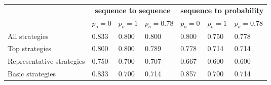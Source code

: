 \begin{tabular}{lllllll}
\toprule
{} & \multicolumn{3}{c}{\textbf{sequence to sequence}} & \multicolumn{3}{c}{\textbf{sequence to probability}} \\
{} &                       $p_o=0$ &                     $p_o=1$ &                    $p_o=0.78$ &                       $p_o=0$ &                       $p_o=1$ &                    $p_o=0.78$ \\
\midrule
All strategies          &  \cellcolor{orange!83.0}0.833   &  \cellcolor{orange!80.0}0.800 &    \cellcolor{orange!80.0}0.800 &    \cellcolor{orange!80.0}0.800 &   \cellcolor{orange!75.0}0.750 &  \cellcolor{orange!78.0}0.778 \\
Top strategies          &    \cellcolor{orange!80.0}0.800 &  \cellcolor{orange!80.0}0.800 &  \cellcolor{orange!79.0}0.789 &  \cellcolor{orange!78.0}0.778 &  \cellcolor{orange!71.0}0.714 &  \cellcolor{orange!71.0}0.714 \\
Representative strategies &   \cellcolor{orange!75.0}0.750  &  \cellcolor{orange!70.0}0.700 &  \cellcolor{orange!71.0}0.707 &  \cellcolor{orange!67.0}0.667 &    \cellcolor{orange!60.0}0.600 &    \cellcolor{orange!60.0}0.600 \\
Basic strategies        &  \cellcolor{orange!83.0}0.833   &  \cellcolor{orange!70.0}0.700 &  \cellcolor{orange!71.0}0.714 &  \cellcolor{orange!86.0}0.857 &    \cellcolor{orange!70.0}0.700 &  \cellcolor{orange!71.0}0.714 \\
\bottomrule
\end{tabular}
